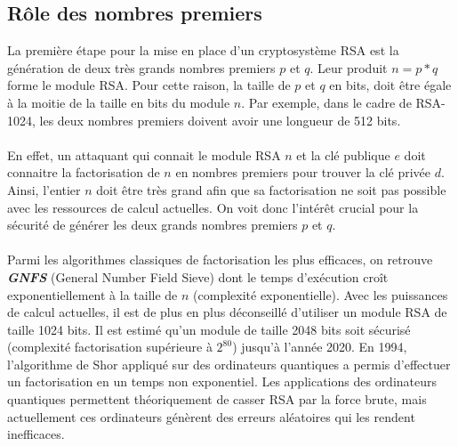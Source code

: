 		\subsection{Rôle des nombres premiers}
		La première étape pour la mise en place d'un cryptosystème RSA est la génération de deux très grands nombres premiers $p$ et $q$. Leur produit $n = p * q$ forme le module RSA. Pour cette raison, la taille de $p$ et $q$ en bits, doit être égale à la moitie de la taille en bits du module $n$. Par exemple, dans le cadre de RSA-1024, les deux nombres premiers doivent avoir une longueur de 512 bits.
		\paragraph{}En effet, un attaquant qui connait le module RSA $n$ et la clé publique $e$ doit connaitre la factorisation de $n$ en nombres premiers pour trouver la clé privée $d$. Ainsi, l'entier $n$ doit être très grand afin que sa factorisation ne soit pas possible avec les ressources de calcul actuelles. On voit donc l'intérêt crucial pour la sécurité de générer les deux grands nombres premiers $p$ et $q$.
		\paragraph{}Parmi les algorithmes classiques de factorisation les plus efficaces, on retrouve \textbf{\textit{GNFS}} (General Number Field Sieve) dont le temps d'exécution croît exponentiellement à la taille de $n$ (complexité exponentielle). Avec les puissances de calcul actuelles, il est de plus en plus déconseillé d'utiliser un module RSA de taille 1024 bits. Il est estimé qu'un module de taille 2048 bits soit sécurisé (complexité factorisation supérieure à $2^{80}$) jusqu'à l'année 2020. 
		En 1994, l'algorithme de Shor appliqué sur des ordinateurs quantiques a permis d'effectuer un factorisation en un temps non exponentiel. Les applications des ordinateurs quantiques permettent théoriquement de casser RSA par la force brute, mais actuellement ces ordinateurs génèrent des erreurs aléatoires qui les rendent inefficaces.
		
